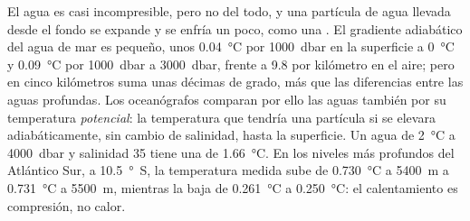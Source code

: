 El agua es casi incompresible, pero no del todo, y una partícula de agua llevada desde el fondo se expande y se enfría un poco, como una . El gradiente adiabático del agua de mar es pequeño, unos \qty{0.04}{\celsius} por
\qty{1000}{dbar} en la superficie a \qty{0}{\celsius} y \qty{0.09}{\celsius} por \qty{1000}{dbar} a \qty{3000}{dbar}, frente a \num{9.8} por kilómetro en el aire; pero en cinco kilómetros suma unas décimas de grado, más que las diferencias entre las aguas profundas. Los oceanógrafos comparan por ello las aguas también por su temperatura \emph{potencial}: la temperatura que tendría una partícula si se elevara adiabáticamente, sin cambio de salinidad, hasta la superficie. Un agua de \qty{2}{\celsius} a \qty{4000}{dbar} y salinidad 35 tiene una  de \qty{1.66}{\celsius}. En los niveles más profundos del Atlántico Sur, a \qty{10.5}{\degree S}, la temperatura medida sube de \qty{0.730}{\celsius} a \qty{5400}{m} a \qty{0.731}{\celsius} a \qty{5500}{m}, mientras la  baja de \qty{0.261}{\celsius} a \qty{0.250}{\celsius}: el calentamiento es compresión, no calor.

